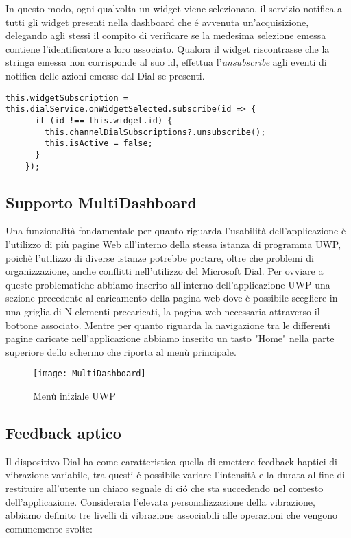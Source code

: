In questo modo, ogni qualvolta un widget viene selezionato, il servizio notifica a tutti gli widget presenti nella dashboard che é avvenuta un'acquisizione, delegando agli stessi il compito di verificare se la medesima selezione emessa contiene l'identificatore a loro associato. Qualora il widget riscontrasse che la stringa emessa non corrisponde al suo id, effettua l'\emph{unsubscribe} agli eventi di notifica delle azioni emesse dal Dial se presenti.

\vspace{1.0cm}
\begin{lstlisting}[caption={Sottoscrizione all'evento di notifica selezione Widget},style=javaScriptCode]
this.widgetSubscription = this.dialService.onWidgetSelected.subscribe(id => {
      if (id !== this.widget.id) {
        this.channelDialSubscriptions?.unsubscribe();
        this.isActive = false;
      }
    });
\end{lstlisting} 
\vspace{1.0cm}

\subsection{Supporto MultiDashboard}
Una funzionalità fondamentale per quanto riguarda l'usabilità dell'applicazione è l'utilizzo di più pagine Web all'interno della stessa istanza di programma UWP, poichè l'utilizzo di diverse istanze potrebbe portare, oltre che problemi di organizzazione, anche conflitti nell'utilizzo del Microsoft Dial. Per ovviare a queste problematiche abbiamo inserito all'interno dell'applicazione UWP una sezione precedente al caricamento della pagina web dove è possibile scegliere in una griglia di N elementi precaricati, la pagina web necessaria attraverso il bottone associato.
Mentre per quanto riguarda la navigazione tra le differenti pagine caricate nell'applicazione abbiamo inserito un tasto "Home" nella parte superiore dello schermo che riporta al menù principale.

\begin{figure}[htpb!]
  \centering
  \texttt{[image: MultiDashboard]}
  \caption{Menù iniziale UWP}
\end{figure}

\subsection{Feedback aptico}
Il dispositivo Dial ha come caratteristica quella di emettere feedback haptici di vibrazione variabile, tra questi é possibile variare l'intensità e la durata al fine di restituire all'utente un chiaro segnale di ció che sta succedendo nel contesto dell'applicazione.
Considerata l'elevata personalizzazione della vibrazione, abbiamo definito tre livelli di vibrazione associabili alle operazioni che vengono comunemente svolte:

